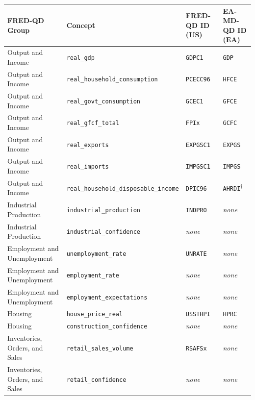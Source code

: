 \documentclass[11pt]{article}
\begin{document}
\begin{longtable}{L{4cm} L{4cm} L{2.8cm} L{2.5cm}}
\toprule
\textbf{FRED-QD Group} & \textbf{Concept} & \textbf{FRED-QD ID (US)} & \textbf{EA-MD-QD ID (EA)} \\
\midrule
\endhead
Output and Income & \texttt{real\_\allowbreak{}gdp} & \texttt{GDPC1} & \texttt{GDP} \\
Output and Income & \texttt{real\_\allowbreak{}household\_\allowbreak{}consumption} & \texttt{PCECC96} & \texttt{HFCE} \\
Output and Income & \texttt{real\_\allowbreak{}govt\_\allowbreak{}consumption} & \texttt{GCEC1} & \texttt{GFCE} \\
Output and Income & \texttt{real\_\allowbreak{}gfcf\_\allowbreak{}total} & \texttt{FPIx} & \texttt{GCFC} \\
Output and Income & \texttt{real\_\allowbreak{}exports} & \texttt{EXPGSC1} & \texttt{EXPGS} \\
Output and Income & \texttt{real\_\allowbreak{}imports} & \texttt{IMPGSC1} & \texttt{IMPGS} \\
Output and Income & \texttt{real\_\allowbreak{}household\_\allowbreak{}disposable\_\allowbreak{}income} & \texttt{DPIC96} & \texttt{AHRDI}$^{\dagger}$ \\
Industrial Production & \texttt{industrial\_\allowbreak{}production} & \texttt{INDPRO} & \emph{none} \\
Industrial Production & \texttt{industrial\_\allowbreak{}confidence} & \emph{none} & \emph{none} \\
Employment and Unemployment & \texttt{unemployment\_\allowbreak{}rate} & \texttt{UNRATE} & \emph{none} \\
Employment and Unemployment & \texttt{employment\_\allowbreak{}rate} & \emph{none} & \emph{none} \\
Employment and Unemployment & \texttt{employment\_\allowbreak{}expectations} & \emph{none} & \emph{none} \\
Housing & \texttt{house\_\allowbreak{}price\_\allowbreak{}real} & \texttt{USSTHPI} & \texttt{HPRC} \\
Housing & \texttt{construction\_\allowbreak{}confidence} & \emph{none} & \emph{none} \\
Inventories, Orders, and Sales & \texttt{retail\_\allowbreak{}sales\_\allowbreak{}volume} & \texttt{RSAFSx} & \emph{none} \\
Inventories, Orders, and Sales & \texttt{retail\_\allowbreak{}confidence} & \emph{none} & \emph{none} \\

\end{longtable}
\end{document}
